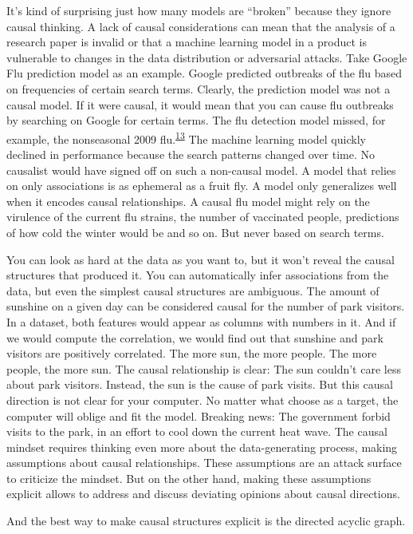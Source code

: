 \documentclass[
  10pt,
]{scrbook}
\begin{document}
It's kind of surprising just how many models are ``broken'' because they ignore causal thinking.
A lack of causal considerations can mean that the analysis of a research paper is invalid or that a machine learning model in a product is vulnerable to changes in the data distribution or adversarial attacks.
Take Google Flu prediction model as an example.
Google predicted outbreaks of the flu based on frequencies of certain search terms.
Clearly, the prediction model was not a causal model.
If it were causal, it would mean that you can cause flu outbreaks by searching on Google for certain terms.
The flu detection model missed, for example, the nonseasonal 2009 flu.\textsuperscript{\protect\hyperlink{ref-lazer2014parable}{13}}
The machine learning model quickly declined in performance because the search patterns changed over time.
No causalist would have signed off on such a non-causal model.
A model that relies on only associations is as ephemeral as a fruit fly.
A model only generalizes well when it encodes causal relationships.
A causal flu model might rely on the virulence of the current flu strains, the number of vaccinated people, predictions of how cold the winter would be and so on.
But never based on search terms.

You can look as hard at the data as you want to, but it won't reveal the causal structures that produced it.
You can automatically infer associations from the data, but even the simplest causal structures are ambiguous.
The amount of sunshine on a given day can be considered causal for the number of park visitors.
In a dataset, both features would appear as columns with numbers in it.
And if we would compute the correlation, we would find out that sunshine and park visitors are positively correlated.
The more sun, the more people.
The more people, the more sun.
The causal relationship is clear: The sun couldn't care less about park visitors.
Instead, the sun is the cause of park visits.
But this causal direction is not clear for your computer.
No matter what choose as a target, the computer will oblige and fit the model.
Breaking news: The government forbid visits to the park, in an effort to cool down the current heat wave.
The causal mindset requires thinking even more about the data-generating process, making assumptions about causal relationships.
These assumptions are an attack surface to criticize the mindset.
But on the other hand, making these assumptions explicit allows to address and discuss deviating opinions about causal directions.

And the best way to make causal structures explicit is the directed acyclic graph.
\end{document}
